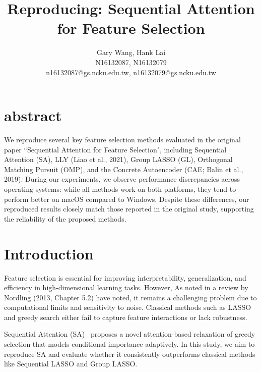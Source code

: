 \documentclass[a4paper,twocolumn]{article} %
\begin{document}

\title{Reproducing: Sequential Attention for Feature Selection}
\author{Gary Wang, Hank Lai \\ N16132087, N16132079 \\ n16132087@gs.ncku.edu.tw, n16132079@gs.ncku.edu.tw} 


\maketitle                     %

\section{abstract}
We reproduce several key feature selection methods evaluated in the original paper ``Sequential Attention for Feature Selection", including Sequential Attention (SA), LLY (Liao et al., 2021), Group LASSO (GL), Orthogonal Matching Pursuit (OMP), and the Concrete Autoencoder (CAE; Balin et al., 2019). During our experiments, we observe performance discrepancies across operating systems: while all methods work on both platforms, they tend to perform better on macOS compared to Windows. Despite these differences, our reproduced results closely match those reported in the original study, supporting the reliability of the proposed methods.


\section{Introduction}

Feature selection is essential for improving interpretability, generalization, and efficiency in high-dimensional learning tasks.
 However, As noted in a review by Nordling (2013, Chapter 5.2) have noted, it remains a challenging problem due to 
computational limits and sensitivity to noise. Classical methods such as LASSO and greedy search either fail to capture feature interactions or lack robustness.

Sequential Attention (SA)~\cite{yasuda2023} proposes a novel attention-based relaxation of greedy selection that models conditional importance adaptively. 
In this study, we aim to reproduce SA and evaluate whether it consistently outperforms classical methods 
like Sequential LASSO and Group LASSO.
\end{document}
